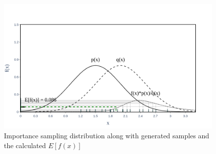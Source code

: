     \begin{figure}[H]
        \centering
        \includegraphics[scale=0.30]{Figures/Images/Illustrative Example/IS_dist.png}
        \caption{Importance sampling distribution along with generated samples and the calculated $E[f(x)]$}
        \label{fig:IS_dist}
    \end{figure}